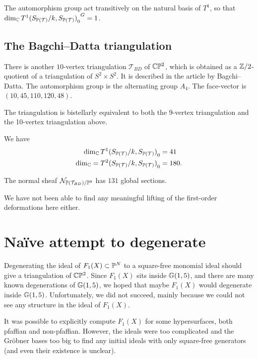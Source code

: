 The automorphism group act transitively on the natural basis of $T^1$, so that $\dim_\C {{T^1(S_{\P(\mathcal T)}/k, S_{\P(\mathcal T)})}_0}^G=1$. 

\subsection{The Bagchi--Datta triangulation}

There is another $10$-vertex triangulation $\mathcal T_{BD}$ of $\C \P^2$, which is obtained as a $\Z/2$-quotient of a triangulation of $S^2 \times S^2$. It is described in the article \cite{bagchi_datta} by Bagchi--Datta. The automorphism group is the alternating group $A_4$. The face-vector is $(10,45,110,120,48)$.

The triangulation is bistellarly equivalent to both the 9-vertex triangulation and the 10-vertex triangulation above.

\begin{proposition}
We have
\begin{eqnarray*}
\dim_\C  {T^1(S_{\P(\mathcal T)}/k, S_{\P(\mathcal T)})}_0 &= 41 \\
\dim_\C = {T^2(S_{\P(\mathcal T)}/k, S_{\P(\mathcal T)})}_0 &=180.
\end{eqnarray*}

The normal sheaf $\mathcal N_{\P(\mathcal T_{BD})/\P^{8}}$ has $131$ global sections.
\end{proposition}

We have not been able to find any meaningful lifting of the first-order deformations here either.

\section{Naïve attempt to degenerate}

Degenerating the ideal of $F_1(X) \subset \P^N$ to a square-free monomial ideal should give a triangulation of $\C \P^2$. Since $F_1(X)$ sits inside $\Gr(1,5)$, and there are many known degenerations of $\Gr(1,5)$, we hoped that maybe $F_1(X)$ would degenerate inside $\Gr(1,5)$. Unfortunately, we did not succeed, mainly because we could not see any structure in the ideal of $F_1(X)$.

It was possible to explicitly compute $F_1(X)$ for some hypersurfaces, both pfaffian and non-pfaffian. However, the ideals were too complicated and the Gröbner bases too big to find any initial ideals with only square-free generators (and even their existence is unclear).

